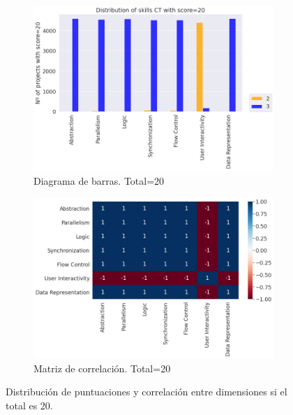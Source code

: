 \documentclass[a4paper, 12pt]{book}
\begin{document}
\begin{figure}[H]
    \centering
    \begin{subfigure}[h]{.49\textwidth} 
        \includegraphics[width=\textwidth]{img/distribucion_20_Scratch}
        \caption{Diagrama de barras. Total=20}
        \label{fig:total20}
    \end{subfigure}       
    \begin{subfigure}[h]{.49\textwidth} 
        \includegraphics[width=\textwidth]{img/corr_20_Scratch}
        \caption{Matriz de correlación. Total=20}
        \label{fig:corr20}
    \end{subfigure}
     \caption{Distribución de puntuaciones y correlación entre dimensiones si el total es 20.}
\end{figure}
\end{document}
